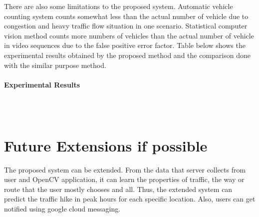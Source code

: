 \par There are also some limitations to the proposed system. Automatic vehicle counting system counts somewhat less than the actual number of vehicle due to congestion and heavy traffic flow situation in one scenario. Statistical computer vision method counts more numbers of vehicles than the actual number of vehicle in video sequences due to the false positive error factor. Table below shows the experimental results obtained by the proposed method and the comparison done with the similar purpose method.\\ \\
\newpage
\textbf{Experimental Results}\\[0.5 cm]
\begin{table}[ht]
\caption{Experimental Results}
\end{table}
\\
\\
\section{Future Extensions if possible}

The proposed system can be extended. From the data that server collects from user and OpenCV application, it can learn the properties of traffic, the way or route that the user mostly chooses and all. Thus, the extended system can predict the traffic hike in peak hours for each specific location. Also, users can get notified using google cloud messaging.
